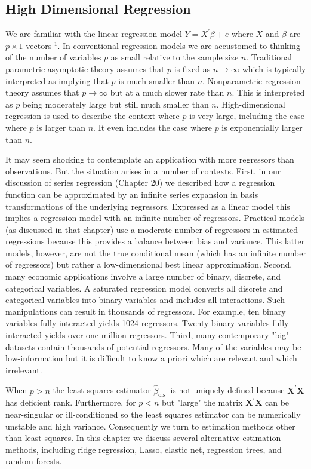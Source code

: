 \documentclass[10pt]{article}
\begin{document}
\subsection{High Dimensional Regression}
We are familiar with the linear regression model $Y=X^{\prime} \beta+e$ where $X$ and $\beta$ are $p \times 1$ vectors ${ }^{1}$. In conventional regression models we are accustomed to thinking of the number of variables $p$ as small relative to the sample size $n$. Traditional parametric asymptotic theory assumes that $p$ is fixed as $n \rightarrow \infty$ which is typically interpreted as implying that $p$ is much smaller than $n$. Nonparametric regression theory assumes that $p \rightarrow \infty$ but at a much slower rate than $n$. This is interpreted as $p$ being moderately large but still much smaller than $n$. High-dimensional regression is used to describe the context where $p$ is very large, including the case where $p$ is larger than $n$. It even includes the case where $p$ is exponentially larger than $n$.

It may seem shocking to contemplate an application with more regressors than observations. But the situation arises in a number of contexts. First, in our discussion of series regression (Chapter 20) we described how a regression function can be approximated by an infinite series expansion in basis transformations of the underlying regressors. Expressed as a linear model this implies a regression model with an infinite number of regressors. Practical models (as discussed in that chapter) use a moderate number of regressors in estimated regressions because this provides a balance between bias and variance. This latter models, however, are not the true conditional mean (which has an infinite number of regressors) but rather a low-dimensional best linear approximation. Second, many economic applications involve a large number of binary, discrete, and categorical variables. A saturated regression model converts all discrete and categorical variables into binary variables and includes all interactions. Such manipulations can result in thousands of regressors. For example, ten binary variables fully interacted yields 1024 regressors. Twenty binary variables fully interacted yields over one million regressors. Third, many contemporary "big" datasets contain thousands of potential regressors. Many of the variables may be low-information but it is difficult to know a priori which are relevant and which irrelevant.

When $p>n$ the least squares estimator $\widehat{\beta}_{\text {ols }}$ is not uniquely defined because $\boldsymbol{X}^{\prime} \boldsymbol{X}$ has deficient rank. Furthermore, for $p<n$ but "large" the matrix $\boldsymbol{X}^{\prime} \boldsymbol{X}$ can be near-singular or ill-conditioned so the least squares estimator can be numerically unstable and high variance. Consequently we turn to estimation methods other than least squares. In this chapter we discuss several alternative estimation methods, including ridge regression, Lasso, elastic net, regression trees, and random forests.
\end{document}
